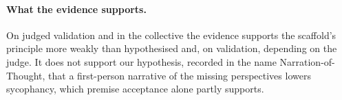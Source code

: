 \paragraph{What the evidence supports.}
On judged validation and in the collective the evidence supports the
scaffold's principle more weakly than
hypothesised and, on validation, depending on the judge. It does not
support our hypothesis, recorded in the name Narration-of-Thought, that a
first-person narrative of the missing perspectives lowers sycophancy,
which premise acceptance alone partly supports.
